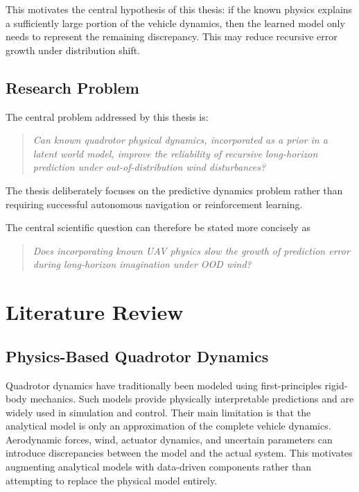 \documentclass[conference]{IEEEtran}
\begin{document}
This motivates the central hypothesis of this thesis: if the known
physics explains a sufficiently large portion of the vehicle dynamics,
then the learned model only needs to represent the remaining
discrepancy. This may reduce recursive error growth under distribution
shift.


\subsection{Research Problem}

The central problem addressed by this thesis is:

\begin{quote}
\itshape
Can known quadrotor physical dynamics, incorporated as a prior in a
latent world model, improve the reliability of recursive long-horizon
prediction under out-of-distribution wind disturbances?
\end{quote}

The thesis deliberately focuses on the predictive dynamics problem
rather than requiring successful autonomous navigation or reinforcement
learning.

The central scientific question can therefore be stated more
concisely as

\begin{quote}
\itshape
Does incorporating known UAV physics slow the growth of prediction
error during long-horizon imagination under OOD wind?
\end{quote}


\section{Literature Review}


\subsection{Physics-Based Quadrotor Dynamics}

Quadrotor dynamics have traditionally been modeled using first-principles rigid-body mechanics. Such models provide physically interpretable predictions and are widely used in simulation and control. Their main limitation is that the analytical model is only an approximation of the complete vehicle dynamics. Aerodynamic forces, wind, actuator dynamics, and uncertain parameters can introduce
discrepancies between the model and the actual system. This motivates augmenting analytical models with data-driven components rather than attempting to replace the physical model entirely.
\end{document}
